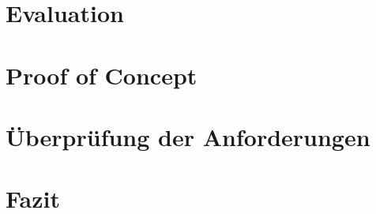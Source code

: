 \documentclass[
11pt, %
a4paper, %
BCOR10mm, %
DIV14, %
footsepline = false, %
headsepline, %
oneside, %
openright,
parskip=half, %
abstracton, %
listof=totocnumbered, %
bibliography=totocnumbered %
]{scrreprt}
\begin{document}
  \chapter{Evaluation}
  \label{cha:evaluation}
  

  \chapter{Proof of Concept}
  \label{cha:proof_of_concept}
  
  
  \chapter{Überprüfung der Anforderungen}
  \label{cha:überprüfung_der_anforderungen}
  
    
  \chapter{Fazit}
  \label{cha:fazit}
  
  \appendix  
  \listoffigures
  \listoftables
  \lstlistoflistings
  
  \glsaddall
  \printglossaries
  
  \nocite{*}
  
  
\end{document}
